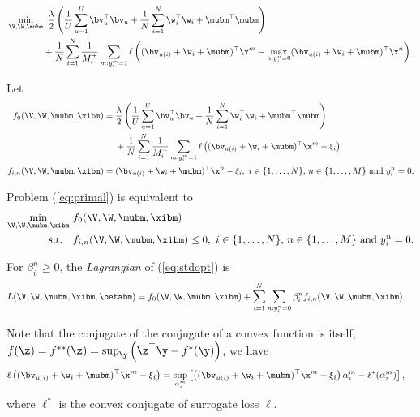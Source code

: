 \begin{equation}
\label{eq:primal}
\begin{aligned}
&\min_{\V, \W, \mubm} \ \frac{\lambda}{2} \left( \frac{1}{U} \sum_{u=1}^U \bv_u^\top \bv_u 
     + \frac{1}{N} \sum_{i=1}^N \w_i^\top \w_i + \mubm^\top \mubm \right) \\
& \hspace{4em}
     + \frac{1}{N} \sum_{i=1}^N \frac{1}{M_i^+} \sum_{m: y_i^m = 1} \ell \left( (\bv_{u(i)} + \w_i + \mubm)^\top \x^m 
     - \max_{n: y_i^n = 0} (\bv_{u(i)} + \w_i + \mubm)^\top \x^n \right).
\end{aligned}
\end{equation}

Let 
\begin{equation*}
\begin{aligned}
f_0(\V, \W, \mubm, \xibm) &= \frac{\lambda}{2} \left( \frac{1}{U} \sum_{u=1}^U \bv_u^\top \bv_u 
     + \frac{1}{N} \sum_{i=1}^N \w_i^\top \w_i + \mubm^\top \mubm \right) \\
& \quad \ 
     + \frac{1}{N} \sum_{i=1}^N \frac{1}{M_i^+} \sum_{m: y_i^m = 1} 
       \ell \left( (\bv_{u(i)} + \w_i + \mubm)^\top \x^m - \xi_i \right) \\
f_{i,n} (\V, \W, \mubm, \xibm) &= (\bv_{u(i)} + \w_i + \mubm)^\top \x^n - \xi_i, \
i \in \{1,\dots,N\}, \, n \in \{1,\dots,M\} \ \mathrm{and} \ y_i^n = 0.
\end{aligned}
\end{equation*}

Problem (\ref{eq:primal}) is equivalent to 
\begin{equation}
\label{eq:stdopt}
\begin{aligned}
\min_{\V, \W, \mubm, \xibm} \ & f_0(\V, \W, \mubm, \xibm) \\
s.t. \quad & f_{i,n}(\V, \W, \mubm, \xibm) \le 0, \
i \in \{1,\dots,N\}, \, n \in \{1,\dots,M\} \ \mathrm{and} \ y_i^n = 0.
\end{aligned}
\end{equation}

For $\beta_i^n \ge 0$, the \emph{Lagrangian} of (\ref{eq:stdopt}) is
\begin{equation*}
\begin{aligned}
L(\V, \W, \mubm, \xibm, \betabm) 
&= f_0(\V, \W, \mubm, \xibm) + \sum_{i=1}^N \sum_{n: y_i^n = 0} \beta_i^n f_{i,n} (\V, \W, \mubm, \xibm).
\end{aligned}
\end{equation*}

Note that the conjugate of the conjugate of a convex function is itself, \ie $f(\z) = f^{**}(\z) = \sup_\y \left(\z^\top \y - f^*(\y) \right)$, we have
\begin{equation*}
\begin{aligned}
\ell \left( (\bv_{u(i)} + \w_i + \mubm)^\top \x^m - \xi_i \right)
&= \sup_{\alpha_i^m} \left[ \left( (\bv_{u(i)} + \w_i + \mubm)^\top \x^m - \xi_i \right) \alpha_i^m - \ell^*(\alpha_i^m) \right],
\end{aligned}
\end{equation*}
where $\ell^*$ is the convex conjugate of surrogate loss $\ell$.

